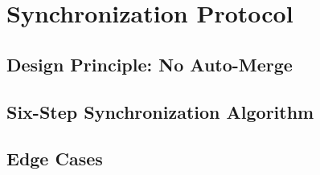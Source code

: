 %

\chapter{Synchronization Protocol}

\section{Design Principle: No Auto-Merge}

\section{Six-Step Synchronization Algorithm}

\section{Edge Cases}
